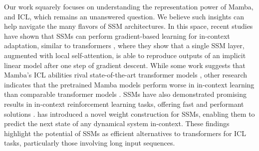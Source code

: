 Our work squarely focuses on understanding the representation power of Mamba, and ICL, which remains an unanswered question. We believe such insights can help navigate the many flavors of SSM architectures. In this space, recent studies have shown that SSMs can perform gradient-based learning for in-context adaptation, similar to transformers \cite{sushma2024state}, where they show that a single SSM layer, augmented with local self-attention, is able to reproduce outputs of an implicit linear model after one step of gradient descent. While some work suggests that Mamba's ICL abilities rival state-of-the-art transformer models \cite{grazzi2024mamba}, other research indicates that the pretrained Mamba models perform worse in in-context learning than comparable transformer models \cite{halloran2024mamba,akyurek2024context}. SSMs have also demonstrated promising results in in-context reinforcement learning tasks, offering fast and performant solutions \cite{lu2024structured}. \cite{joseph2024hippo} has introduced a novel weight construction for SSMs, enabling them to predict the next state of any dynamical system in-context. These findings highlight the potential of SSMs as efficient alternatives to transformers for ICL tasks, particularly those involving long input sequences.